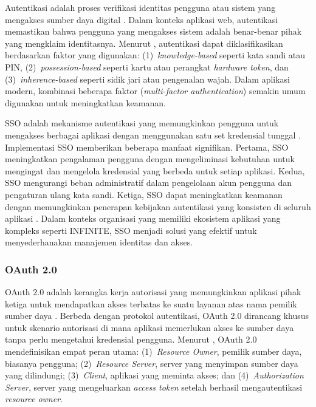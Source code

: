 Autentikasi adalah proses verifikasi identitas pengguna atau sistem yang mengakses sumber daya digital \citep{Grassi_2017_NIST800}. Dalam konteks aplikasi web, autentikasi memastikan bahwa pengguna yang mengakses sistem adalah benar-benar pihak yang mengklaim identitasnya. Menurut \citet{Ometov_2018_MultiFactorAuth}, autentikasi dapat diklasifikasikan berdasarkan faktor yang digunakan: (1)~\textit{knowledge-based} seperti kata sandi atau PIN, (2)~\textit{possession-based} seperti kartu atau perangkat \textit{hardware token}, dan (3)~\textit{inherence-based} seperti sidik jari atau pengenalan wajah. Dalam aplikasi modern, kombinasi beberapa faktor (\textit{multi-factor authentication}) semakin umum digunakan untuk meningkatkan keamanan.

SSO adalah mekanisme autentikasi yang memungkinkan pengguna untuk mengakses berbagai aplikasi dengan menggunakan satu set kredensial tunggal \citep{Pashalidis_2003_SSO}. Implementasi SSO memberikan beberapa manfaat signifikan. Pertama, SSO meningkatkan pengalaman pengguna dengan mengeliminasi kebutuhan untuk mengingat dan mengelola kredensial yang berbeda untuk setiap aplikasi. Kedua, SSO mengurangi beban administratif dalam pengelolaan akun pengguna dan pengaturan ulang kata sandi. Ketiga, SSO dapat meningkatkan keamanan dengan memungkinkan penerapan kebijakan autentikasi yang konsisten di seluruh aplikasi \citep{Liu_2018_AndroidSSOSecurity}. Dalam konteks organisasi yang memiliki ekosistem aplikasi yang kompleks seperti INFINITE, SSO menjadi solusi yang efektif untuk menyederhanakan manajemen identitas dan akses.

\subsubsection{OAuth 2.0}

OAuth 2.0 adalah kerangka kerja autorisasi yang memungkinkan aplikasi pihak ketiga untuk mendapatkan akses terbatas ke suatu layanan atas nama pemilik sumber daya \citep{Hardt_2012_OAuth2}. Berbeda dengan protokol autentikasi, OAuth 2.0 dirancang khusus untuk skenario autorisasi di mana aplikasi memerlukan akses ke sumber daya tanpa perlu mengetahui kredensial pengguna. Menurut \citet{Fett_2016_OAuth2Security}, OAuth 2.0 mendefinisikan empat peran utama: (1)~\textit{Resource Owner}, pemilik sumber daya, biasanya pengguna; (2)~\textit{Resource Server}, server yang menyimpan sumber daya yang dilindungi; (3)~\textit{Client}, aplikasi yang meminta akses; dan (4)~\textit{Authorization Server}, server yang mengeluarkan \textit{access token} setelah berhasil mengautentikasi \textit{resource owner}.

